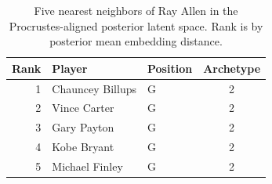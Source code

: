 \begin{table}[htbp]
  \centering\small
  \begin{tabular}{rllc}
    \toprule
    Rank & Player & Position & Archetype \\
    \midrule
    1 & Chauncey Billups & G & 2 \\
    2 & Vince Carter & G & 2 \\
    3 & Gary Payton & G & 2 \\
    4 & Kobe Bryant & G & 2 \\
    5 & Michael Finley & G & 2 \\
    \bottomrule
  \end{tabular}
  \caption{Five nearest neighbors of Ray Allen in the Procrustes-aligned posterior latent space. Rank is by posterior mean embedding distance.}
\end{table}

